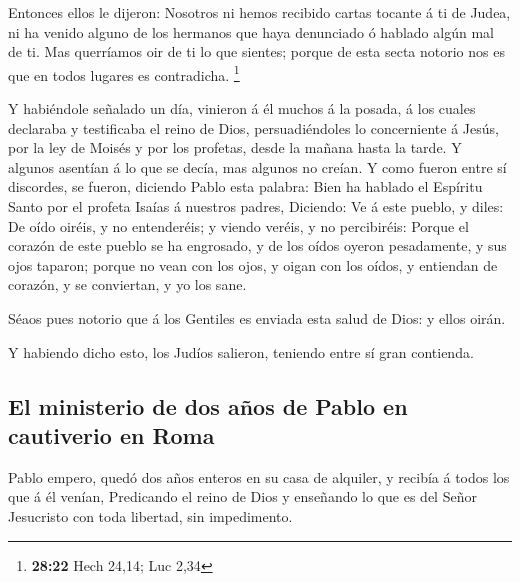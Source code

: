  Entonces ellos le dijeron: Nosotros ni hemos recibido
cartas tocante á ti de Judea, ni ha venido alguno de los hermanos que
haya denunciado ó hablado algún mal de ti.  Mas querríamos
oir de ti lo que sientes; porque de esta secta notorio nos es que en
todos lugares es contradicha. \footnote{\textbf{28:22} Hech 24,14; Luc
  2,34}

 Y habiéndole señalado un día, vinieron á él muchos á la
posada, á los cuales declaraba y testificaba el reino de Dios,
persuadiéndoles lo concerniente á Jesús, por la ley de Moisés y por los
profetas, desde la mañana hasta la tarde.  Y algunos
asentían á lo que se decía, mas algunos no creían.  Y como
fueron entre sí discordes, se fueron, diciendo Pablo esta palabra: Bien
ha hablado el Espíritu Santo por el profeta Isaías á nuestros padres,
 Diciendo: Ve á este pueblo, y diles: De oído oiréis, y no
entenderéis; y viendo veréis, y no percibiréis:  Porque el
corazón de este pueblo se ha engrosado, y de los oídos oyeron
pesadamente, y sus ojos taparon; porque no vean con los ojos, y oigan
con los oídos, y entiendan de corazón, y se conviertan, y yo los sane.

 Séaos pues notorio que á los Gentiles es enviada esta
salud de Dios: y ellos oirán.

 Y habiendo dicho esto, los Judíos salieron, teniendo entre
sí gran contienda.

\hypertarget{el-ministerio-de-dos-auxf1os-de-pablo-en-cautiverio-en-roma}{%
\subsection{El ministerio de dos años de Pablo en cautiverio en
Roma}\label{el-ministerio-de-dos-auxf1os-de-pablo-en-cautiverio-en-roma}}

 Pablo empero, quedó dos años enteros en su casa de
alquiler, y recibía á todos los que á él venían, 
Predicando el reino de Dios y enseñando lo que es del Señor Jesucristo
con toda libertad, sin impedimento.
